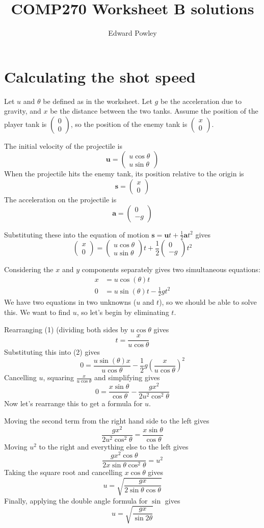 \documentclass{article}
\title{COMP270 Worksheet B solutions}
\author{Edward Powley}
\newcommand{\colvec}[2]{\begin{pmatrix}#1\\#2\end{pmatrix}}
\begin{document}
\maketitle

\section{Calculating the shot speed}

Let $u$ and $\theta$ be defined as in the worksheet.
Let $g$ be the acceleration due to gravity, and $x$ be the distance between the two tanks.
Assume the position of the player tank is $\colvec{0}{0}$, so the position of the enemy tank is $\colvec{x}{0}$.

The initial velocity of the projectile is
$$ \mathbf{u} = \colvec{u\cos\theta}{u\sin\theta} $$
When the projectile hits the enemy tank, its position relative to the origin is
$$ \mathbf{s} = \colvec{x}{0} $$
The acceleration on the projectile is
$$ \mathbf{a} = \colvec{0}{-g} $$

Substituting these into the equation of motion $\mathbf{s} = \mathbf{u}t + \frac12\mathbf{a}t^2$ gives
$$ \colvec{x}{0} = \colvec{u\cos\theta}{u\sin\theta} t + \frac12 \colvec{0}{-g} t^2 $$

Considering the $x$ and $y$ components separately gives two simultaneous equations:
\begin{align}
    x &= u \cos(\theta) t \tag{1} \\
    0 &= u \sin(\theta) t - \frac12 g t^2 \tag{2}
\end{align}
We have two equations in two unknowns ($u$ and $t$), so we should be able to solve this.
We want to find $u$, so let's begin by eliminating $t$.

Rearranging (1) (dividing both sides by $u \cos\theta$ gives
$$ t = \frac{x}{u \cos\theta} $$
Substituting this into (2) gives
$$ 0 = \frac{u \sin(\theta) x}{u \cos\theta} - \frac12 g \left(\frac{x}{u \cos\theta}\right)^2 $$
Cancelling $u$, squaring $\frac{x}{u \cos\theta}$ and simplifying gives
$$ 0 = \frac{x \sin\theta}{\cos\theta} - \frac{g x^2}{2 u^2 \cos^2 \theta} $$
Now let's rearrange this to get a formula for $u$.

Moving the second term from the right hand side to the left gives
$$ \frac{g x^2}{2 u^2 \cos^2 \theta} = \frac{x \sin\theta}{\cos\theta} $$
Moving $u^2$ to the right and everything else to the left gives
$$ \frac{g x^2 \cos\theta}{2 x \sin\theta \cos^2 \theta} = u^2 $$
Taking the square root and cancelling $x\cos\theta$ gives
$$ u = \sqrt{\frac{g x}{2 \sin\theta \cos \theta}} $$
Finally, applying the double angle formula for $\sin$ gives
$$ u = \sqrt{\frac{g x}{\sin 2\theta}} $$
\end{document}

